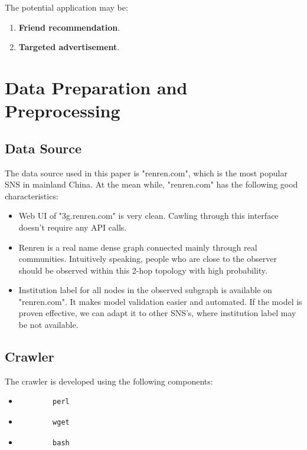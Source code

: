 \documentclass[11pt,a4paper]{article}
\begin{document}
The potential application may be:
\begin{enumerate}
	\item \textbf{Friend recommendation}. 
	\item \textbf{Targeted advertisement}. 
\end{enumerate}

\section{Data Preparation and Preprocessing}

\subsection{Data Source}

The data source used in this paper is "renren.com", which is the 
most popular SNS in mainland China. At the mean while, "renren.com" 
has the following good characteristics:
\begin{itemize}
	\item Web UI of "3g.renren.com" is very clean. Cawling through
	this interface doesn't require any API calls.  
	\item Renren is a real name dense graph connected mainly through 
	real communities. Intuitively speaking, 
	people who are close to the observer should be observed within 
	this 2-hop topology with high probability. 
	\item Institution label for all nodes in the observed subgraph
	is available on "renren.com". It makes model validation easier
	and automated. If the model is proven effective, we can adapt 
	it to other SNS's, where institution label may be not available.  
\end{itemize}

\subsection{Crawler}

The crawler is developed using the following components:
\begin{itemize}
	\item \begin{verbatim}
		perl
	\end{verbatim}
	\item \begin{verbatim}
		wget
	\end{verbatim}
	\item \begin{verbatim}
		bash
	\end{verbatim}
\end{itemize}
\end{document}
